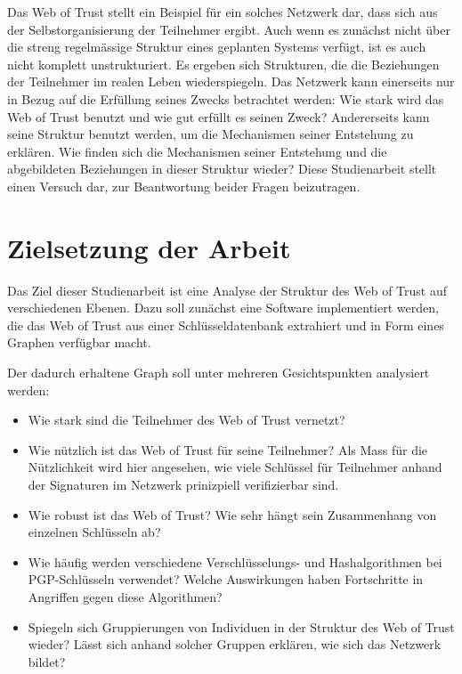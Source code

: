 Das Web of Trust stellt ein Beispiel f\"ur ein solches Netzwerk dar,
dass sich aus der Selbstorganisierung der Teilnehmer ergibt. Auch wenn
es zun\"achst nicht \"uber die streng regelm\"assige Struktur eines
geplanten Systems verf\"ugt, ist es auch nicht komplett
unstrukturiert. Es ergeben sich Strukturen, die die Beziehungen der
Teilnehmer im realen Leben wiederspiegeln. Das Netzwerk kann
einerseits nur in Bezug auf die Erf\"ullung seines Zwecks betrachtet
werden: Wie stark wird das Web of Trust benutzt und wie gut erf\"ullt
es seinen Zweck? Andererseits kann seine Struktur benutzt werden, um
die Mechanismen seiner Entstehung zu erkl\"aren. Wie finden sich die
Mechanismen seiner Entstehung und die abgebildeten Beziehungen in
dieser Struktur wieder? Diese Studienarbeit stellt einen Versuch dar,
zur Beantwortung beider Fragen beizutragen.


\section{Zielsetzung der Arbeit}
\label{ch:Einleitung:sec:Zielsetzung}

Das Ziel dieser Studienarbeit ist eine Analyse der Struktur des Web of
Trust auf verschiedenen Ebenen. Dazu soll zun\"achst eine Software
implementiert werden, die das Web of Trust aus einer
Schl\"usseldatenbank extrahiert und in Form eines Graphen verf\"ugbar
macht. 

Der dadurch erhaltene Graph soll unter mehreren Gesichtspunkten
analysiert werden:

\begin{itemize}

\item Wie stark sind die Teilnehmer des Web of Trust vernetzt?

\item  Wie n\"utzlich ist das Web of Trust f\"ur seine Teilnehmer? Als
  Mass f\"ur die N\"utzlichkeit wird hier angesehen, wie viele
  Schl\"ussel f\"ur Teilnehmer anhand der Signaturen im Netzwerk
  prinizpiell verifizierbar sind.

\item Wie robust ist das Web of Trust? Wie sehr h\"angt sein
  Zusammenhang von einzelnen Schl\"usseln ab?

\item Wie h\"aufig werden verschiedene Verschl\"usselungs- und
  Hashalgorithmen bei PGP-Schl\"usseln verwendet? Welche Auswirkungen
  haben Fortschritte in Angriffen gegen diese Algorithmen?

\item Spiegeln sich Gruppierungen von Individuen in der Struktur des
  Web of Trust wieder? L\"asst sich anhand solcher Gruppen erkl\"aren,
  wie sich das Netzwerk bildet?
\end{itemize}

